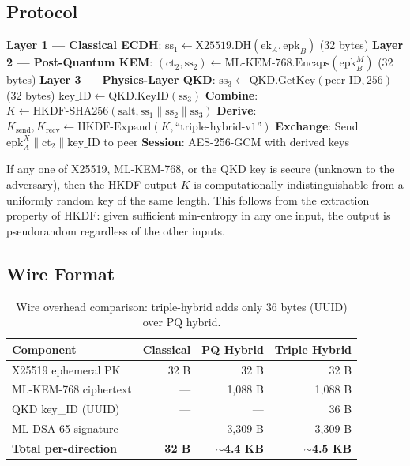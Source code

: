 \documentclass[11pt,letterpaper]{article}
\begin{document}
\subsection{Protocol}

\begin{algorithm}[H]
\caption{Triple-Hybrid Key Exchange}
\begin{algorithmic}[1]
\State \textbf{Layer 1 --- Classical ECDH}:
\State \quad $\text{ss}_1 \gets \text{X25519.DH}(\text{ek}_A, \text{epk}_B)$ \quad (32 bytes)
\Statex
\State \textbf{Layer 2 --- Post-Quantum KEM}:
\State \quad $(\text{ct}_2, \text{ss}_2) \gets \text{ML-KEM-768.Encaps}(\text{epk}_B^M)$ \quad (32 bytes)
\Statex
\State \textbf{Layer 3 --- Physics-Layer QKD}:
\State \quad $\text{ss}_3 \gets \text{QKD.GetKey}(\text{peer\_ID}, 256)$ \quad (32 bytes)
\State \quad $\text{key\_ID} \gets \text{QKD.KeyID}(\text{ss}_3)$
\Statex
\State \textbf{Combine}: $K \gets \text{HKDF-SHA256}(\text{salt}, \text{ss}_1 \| \text{ss}_2 \| \text{ss}_3)$
\State \textbf{Derive}: $K_{\text{send}}, K_{\text{recv}} \gets \text{HKDF-Expand}(K, \text{``triple-hybrid-v1''})$
\State \textbf{Exchange}: Send $\text{epk}_A^X \| \text{ct}_2 \| \text{key\_ID}$ to peer
\State \textbf{Session}: AES-256-GCM with derived keys
\end{algorithmic}
\end{algorithm}

\begin{theorem}
If any one of X25519, ML-KEM-768, or the QKD key is secure (\ie unknown to the adversary), then the HKDF output $K$ is computationally indistinguishable from a uniformly random key of the same length. This follows from the extraction property of HKDF: given sufficient min-entropy in any one input, the output is pseudorandom regardless of the other inputs.
\end{theorem}

\subsection{Wire Format}

\begin{table}[H]
\centering
\begin{tabular}{@{}lrrr@{}}
\toprule
\textbf{Component} & \textbf{Classical} & \textbf{PQ Hybrid} & \textbf{Triple Hybrid} \\
\midrule
X25519 ephemeral PK & 32 B & 32 B & 32 B \\
ML-KEM-768 ciphertext & --- & 1,088 B & 1,088 B \\
QKD key\_ID (UUID) & --- & --- & 36 B \\
ML-DSA-65 signature & --- & 3,309 B & 3,309 B \\
\midrule
\textbf{Total per-direction} & \textbf{32 B} & \textbf{$\sim$4.4 KB} & \textbf{$\sim$4.5 KB} \\
\bottomrule
\end{tabular}
\caption{Wire overhead comparison: triple-hybrid adds only 36 bytes (UUID) over PQ hybrid.}
\label{tab:triple-hybrid-wire}
\end{table}
\end{document}

